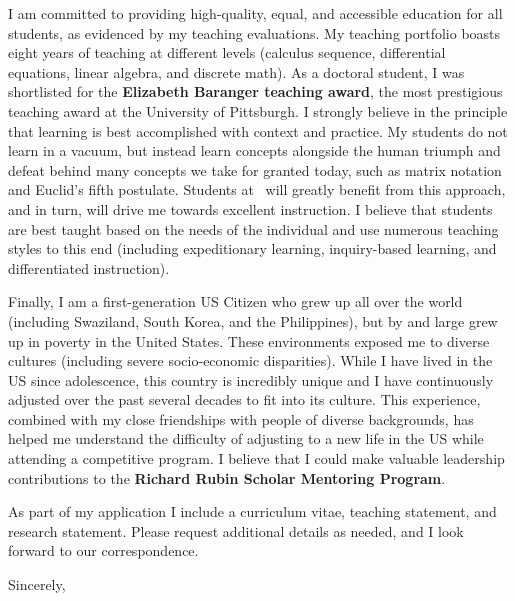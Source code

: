 \documentclass[11pt,a4paper]{letter}
\begin{document}
\begin{letter}
I am committed to providing high-quality, equal, and accessible education for all students, as evidenced by my teaching evaluations. My teaching portfolio boasts eight years of teaching at different levels (calculus sequence, differential equations, linear algebra, and discrete math). As a doctoral student, I was shortlisted for the \textbf{Elizabeth Baranger teaching award}, the most prestigious teaching award at the University of Pittsburgh. I strongly believe in the principle that learning is best accomplished with context and practice. My students do not learn in a vacuum, but instead learn concepts alongside the human triumph and defeat behind many concepts we take for granted today, such as matrix notation and Euclid's fifth postulate. Students at \School~will greatly benefit from this approach, and in turn, will drive me towards excellent instruction. I believe that students are best taught based on the needs of the individual and use numerous teaching styles to this end (including expeditionary learning, inquiry-based learning, and differentiated instruction).

Finally, I am a first-generation US Citizen who grew up all over the world  (including Swaziland, South Korea, and the Philippines), but by and large grew up in poverty in the United States. These environments exposed me to diverse cultures (including severe socio-economic disparities). While I have lived in the US since adolescence, this country is incredibly unique and I have continuously adjusted over the past several decades to fit into its culture. This experience, combined with my close friendships with people of diverse backgrounds, has helped me understand the difficulty of adjusting to a new life in the US while attending a competitive program. I believe that I could make valuable leadership contributions to the \textbf{Richard Rubin Scholar Mentoring Program}.


As part of my application I include a curriculum vitae, teaching statement, and research statement. Please request additional details as needed, and I look forward to our correspondence.

\closing{Sincerely,}
\end{letter}
\end{document}
